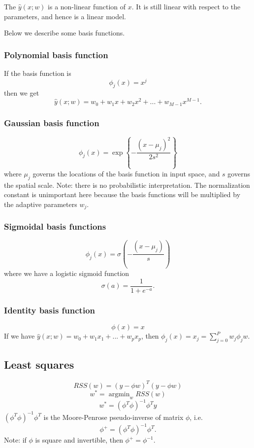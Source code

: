 \documentclass[a4paper,12pt]{article}
\DeclareMathOperator*{\argmin}{argmin}
\begin{document}
The $\hat y(x; w)$ is a non-linear function of $x$. It is still linear with respect to the parameters, and hence is a linear model. 

Below we describe some basis functions. 

\subsubsection{Polynomial basis function}

If the basis function is 
$$\phi_j(x) = x^j$$
then we get
$$\hat y(x; w) = w_0 + w_1x+ w_2x^2+...+w_{M-1}x^{M-1}.$$

\subsubsection{Gaussian basis function}

$$\phi_j(x) = \exp \left\{ -\frac{(x-\mu_j)^2}{2s^2} \right\}$$
where $\mu_j$ governs the locations of the basis function in input space, and $s$ governs the spatial scale. Note: there is no probabilistic interpretation. The normalization constant is unimportant here because the basis functions will be multiplied by the adaptive parameters $w_j$. 

\subsubsection{Sigmoidal basis functions}

$$\phi_j(x) = \sigma \left( -\frac{(x-\mu_j)}{s} \right)$$
where we have a logistic sigmoid function
$$\sigma(a) = \frac{1}{1+e^{-a}}.$$ 

\subsubsection{Identity basis function}

$$\phi(x) = x$$
If we have $\hat y(x; w) = w_0 + w_1x_1+...+w_px_p$, then $\phi_j(x) = x_j = \sum_{j=0}^P w_j \phi_j w$. 
 
\subsection{Least squares}

$$RSS(w) = (y - \phi w)^T (y - \phi w)$$
$$w^* = \argmin_w RSS(w)$$
$$w^* = (\phi^T\phi)^{-1} \phi^T y$$
$(\phi^T\phi)^{-1} \phi^T$ is the Moore-Penrose pseudo-inverse of matrix $\phi$, i.e. 
$$\phi^+ = (\phi^T\phi)^{-1}\phi^T.$$
Note: if $\phi$ is square and invertible, then $\phi^+ = \phi^{-1}$.
\end{document}
